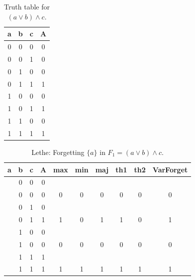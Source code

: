 \begin{table}[!tb]
    \centering
    \begin{tabular}{|c|c|c|c|}
        \hline
        \textbf{a} & \textbf{b} & \textbf{c} & \textbf{A} \\ \hline
        0 & 0 & 0 & 0 \\ \hline
        0 & 0 & 1 & 0 \\ \hline
        0 & 1 & 0 & 0 \\ \hline
        0 & 1 & 1 & 1 \\ \hline
        1 & 0 & 0 & 0 \\ \hline
        1 & 0 & 1 & 1 \\ \hline
        1 & 1 & 0 & 0 \\ \hline
        1 & 1 & 1 & 1 \\ \hline
    \end{tabular}
    \caption{Truth table for $(a \lor b) \land c$.}
    \label{tab:truthtab}
\end{table}

\begin{table}[!tb]
    \centering
    \begin{tabular}{|c|c|c|c|c|c|c|c|c|c|}
        \hline
        \textbf{a} & \textbf{b} & \textbf{c} & \textbf{A} & \textbf{max} & \textbf{min} & \textbf{maj} & \textbf{th1} & \textbf{th2} & \textbf{VarForget} \\ \hline
        \rowcolor{gray!40}  & 0 & 0 & 0 &  &  &  &  &  &  \\ \hline
        \rowcolor{gray!40}  & 0 & 0 & 0 & 0 & 0 & 0 & 0 & 0 & 0 \\ \hline
        \rowcolor{blue!40}  & 0 & 1 & 0 &  &  &  &  &  &  \\ \hline
        \rowcolor{blue!40}  & 0 & 1 & 1 & 1 & 0 & 1 & 1 & 0 & 1 \\ \hline
        \rowcolor{red!40}  & 1 & 0 & 0 &  &  &  &  &  &  \\ \hline
        \rowcolor{red!40}  & 1 & 0 & 0 & 0 & 0 & 0 & 0 & 0 & 0 \\ \hline
        \rowcolor{green!40}  & 1 & 1 & 1 &  &  &  &  &  &  \\ \hline
        \rowcolor{green!40}  & 1 & 1 & 1 & 1 & 1 & 1 & 1 & 1 & 1 \\ \hline
    \end{tabular}
    \caption{Lethe: Forgetting $\{a\}$ in $F_{1} = (a \lor b) \land c$.}
    \label{tab:lethe-F1-a}
\end{table}
